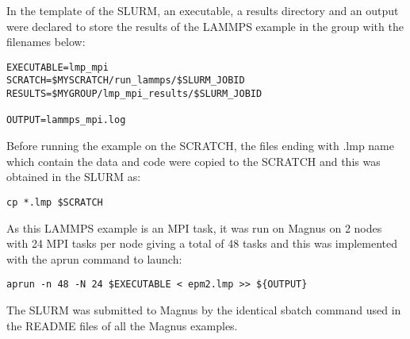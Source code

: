 In the template of the SLURM, an executable, a results directory and an output were declared to store the results of the LAMMPS example in the group 
with the filenames below:

\begin{tcolorbox}
\begin{Verbatim}[fontsize=\scriptsize]
EXECUTABLE=lmp_mpi
SCRATCH=$MYSCRATCH/run_lammps/$SLURM_JOBID
RESULTS=$MYGROUP/lmp_mpi_results/$SLURM_JOBID

OUTPUT=lammps_mpi.log
\end{Verbatim}
\end{tcolorbox}

Before running the example on the SCRATCH, the files ending with .lmp name which contain the data and code were copied to the SCRATCH and this was
obtained in the SLURM as:

\begin{tcolorbox}
\begin{Verbatim}[fontsize=\scriptsize]
cp *.lmp $SCRATCH
\end{Verbatim}
\end{tcolorbox}

As this LAMMPS example is an MPI task, it was run on Magnus on 2 nodes with 24 MPI tasks per node giving a total of 48 tasks and this was implemented
with the aprun command to launch:

\begin{tcolorbox}
\begin{Verbatim}[fontsize=\scriptsize]
aprun -n 48 -N 24 $EXECUTABLE < epm2.lmp >> ${OUTPUT}
\end{Verbatim}
\end{tcolorbox}

The SLURM was submitted to Magnus by the identical sbatch command used in the README files of all the Magnus examples.

